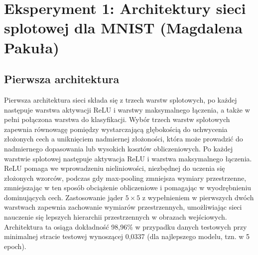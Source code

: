 \documentclass[10pt]{article}
\begin{document}
\pagebreak
\section{Eksperyment 1: Architektury sieci splotowej dla MNIST (Magdalena Pakuła)}\label{sec:ex1-pakula_mnist}

\subsection*{Pierwsza architektura}
Pierwsza architektura sieci składa się z trzech warstw splotowych, po każdej następuje warstwa aktywacji ReLU i warstwy maksymalnego łączenia, a także w pełni połączona warstwa do klasyfikacji.
Wybór trzech warstw splotowych zapewnia równowagę pomiędzy wystarczającą głębokością do uchwycenia złożonych cech a uniknięciem nadmiernej złożoności, która może prowadzić do nadmiernego dopasowania lub wysokich kosztów obliczeniowych.
Po każdej warstwie splotowej następuje aktywacja ReLU i warstwa maksymalnego łączenia. ReLU pomaga we wprowadzeniu nieliniowości, niezbędnej do uczenia się złożonych wzorców, podczas gdy max-pooling zmniejsza wymiary przestrzenne, zmniejszając w ten sposób obciążenie obliczeniowe i pomagając w wyodrębnieniu dominujących cech.
Zastosowanie jąder $5\times5$ z wypełnieniem w pierwszych dwóch warstwach zapewnia zachowanie wymiarów przestrzennych, umożliwiając sieci nauczenie się lepszych hierarchii przestrzennych w obrazach wejściowych.
Architektura ta osiąga dokładność 98,96\% w przypadku danych testowych przy minimalnej stracie testowej wynoszącej 0,0337 (dla najlepszego modelu, tzn. w 5 epoch).
\end{document}
